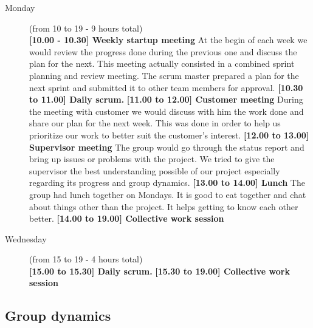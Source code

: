 \begin{description}

\item[Monday] (from 10 to 19 - 9 hours total) \\
\textbf{[10.00 - 10.30] Weekly startup meeting}\newline
At the begin of each week we would review the progress done during the previous one and discuss the plan for the next.
This meeting actually consisted in a combined sprint planning and review meeting.
The scrum master prepared a plan for the next sprint and submitted it to other team members for approval.
\newline\textbf{[10.30 to 11.00] Daily scrum.}\newline
\newline\textbf{[11.00 to 12.00] Customer meeting}\newline
During the meeting with customer we would discuss with him the work done and share our plan for the next week.
This was done in order to help us prioritize our work to better suit the customer's interest.
\newline\textbf{[12.00 to 13.00] Supervisor meeting}\newline
The group would go through the status report and bring up issues or problems with the project.
We tried to give the supervisor the best understanding possible of our project especially regarding
its progress and group dynamics.
\newline\textbf{[13.00 to 14.00] Lunch}\newline
The group had lunch together on Mondays. It is good to eat together and chat about things other than the project.
It helps getting to know each other better.
\newline\textbf{[14.00 to 19.00] Collective work session}
\item[Wednesday] (from 15 to 19 - 4 hours total) \\
\newline\textbf{[15.00 to 15.30] Daily scrum.}\newline
\newline\textbf{[15.30 to 19.00] Collective work session}\newline
\end{description}

\subsection{Group dynamics}
\label{section:dynamics}

